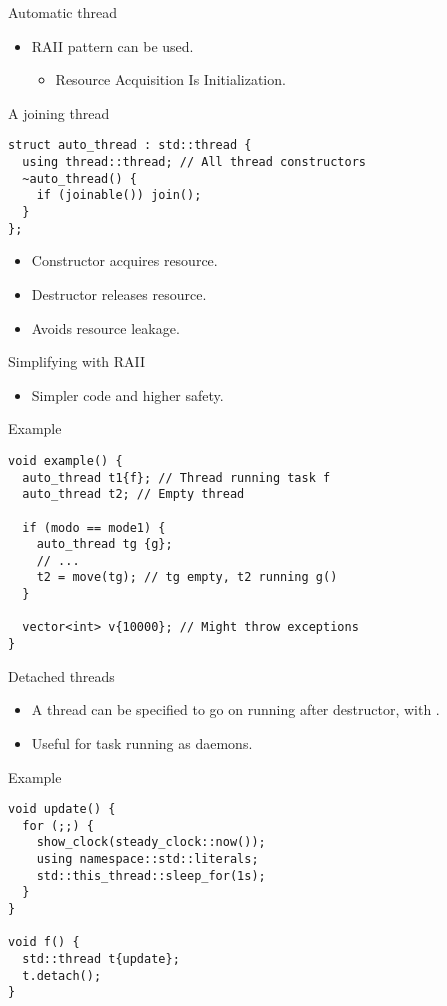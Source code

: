 \begin{frame}[fragile]{Automatic thread}
\begin{itemize}
  \item RAII pattern can be used.
    \begin{itemize}
      \item Resource Acquisition Is Initialization.
    \end{itemize}
\end{itemize}
\begin{block}{A joining thread}
\begin{lstlisting}
struct auto_thread : std::thread {
  using thread::thread; // All thread constructors
  ~auto_thread() { 
    if (joinable()) join(); 
  }
};
\end{lstlisting}
\end{block}
\begin{itemize}
  \item Constructor acquires resource.
  \item Destructor releases resource.
  \item Avoids resource leakage.
\end{itemize}
\end{frame}

\begin{frame}[t,fragile]{Simplifying with RAII}
\begin{itemize}
  \item Simpler code and higher safety.
\end{itemize}
\begin{block}{Example}
\begin{lstlisting}
void example() {
  auto_thread t1{f}; // Thread running task f
  auto_thread t2; // Empty thread

  if (modo == mode1) {
    auto_thread tg {g}; 
    // ...
    t2 = move(tg); // tg empty, t2 running g()
  }

  vector<int> v{10000}; // Might throw exceptions
}
\end{lstlisting}
\end{block}
\end{frame}

\begin{frame}[t,fragile]{Detached threads}
\begin{itemize}
  \item A thread can be specified to go on running after destructor, with .
  \item Useful for task running as daemons.
\end{itemize}
\begin{block}{Example}
\begin{lstlisting}
void update() {
  for (;;) {
    show_clock(steady_clock::now());
    using namespace::std::literals;
    std::this_thread::sleep_for(1s);
  }
}

void f() {
  std::thread t{update};
  t.detach();
}
\end{lstlisting}
\end{block}
\end{frame}


